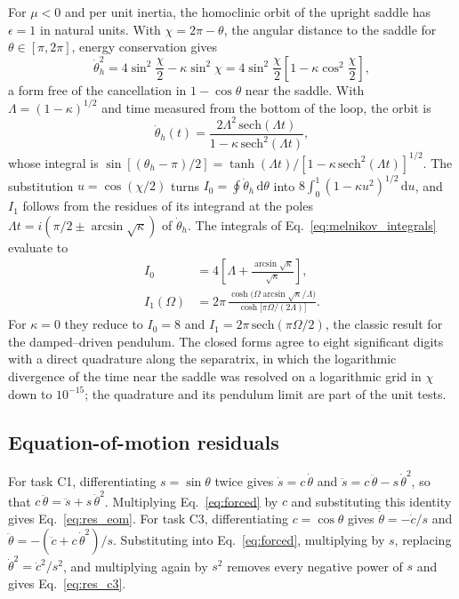 For $\mu<0$ and per unit inertia, the homoclinic orbit of the upright saddle has $\epsilon=1$ in natural units. With $\chi=2\pi-\theta$, the angular distance to the saddle for $\theta\in[\pi,2\pi]$, energy conservation gives
\begin{equation}
\dot\theta_h^{2} = 4\sin^{2}\frac{\chi}{2}-\kappa\sin^{2}\chi = 4\sin^{2}\frac{\chi}{2}\left[1-\kappa\cos^{2}\frac{\chi}{2}\right],
\end{equation}
a form free of the cancellation in $1-\cos\theta$ near the saddle. With $\Lambda=(1-\kappa)^{1/2}$ and time measured from the bottom of the loop, the orbit is
\begin{equation}
\dot\theta_h(t) = \frac{2\Lambda^{2}\,\mathrm{sech}(\Lambda t)}{1-\kappa\,\mathrm{sech}^{2}(\Lambda t)},
\end{equation}
whose integral is $\sin[(\theta_h-\pi)/2]=\tanh(\Lambda t)/[1-\kappa\,\mathrm{sech}^{2}(\Lambda t)]^{1/2}$. The substitution $u=\cos(\chi/2)$ turns $I_0=\oint\dot\theta_h\,\mathrm d\theta$ into $8\int_0^1(1-\kappa u^{2})^{1/2}\,\mathrm du$, and $I_1$ follows from the residues of its integrand at the poles $\Lambda t=i(\pi/2\pm\arcsin\sqrt\kappa)$ of $\dot\theta_h$. The integrals of Eq.~\eqref{eq:melnikov_integrals} evaluate to
\begin{align}
I_0 &= 4\left[\Lambda+\frac{\arcsin\sqrt\kappa}{\sqrt\kappa}\right],\\
I_1(\Omega) &= 2\pi\,\frac{\cosh\bigl(\Omega\arcsin\sqrt\kappa/\Lambda\bigr)}{\cosh\bigl[\pi\Omega/(2\Lambda)\bigr]} .
\end{align}
For $\kappa=0$ they reduce to $I_0=8$ and $I_1=2\pi\,\mathrm{sech}(\pi\Omega/2)$, the classic result for the damped--driven pendulum. The closed forms agree to eight significant digits with a direct quadrature along the separatrix, in which the logarithmic divergence of the time near the saddle was resolved on a logarithmic grid in $\chi$ down to $10^{-15}$; the quadrature and its pendulum limit are part of the unit tests.

\subsection{Equation-of-motion residuals}

For task C1, differentiating $s=\sin\theta$ twice gives $\dot s=c\,\dot\theta$ and $\ddot s=c\,\ddot\theta-s\,\dot\theta^{2}$, so that $c\,\ddot\theta=\ddot s+s\,\dot\theta^{2}$. Multiplying Eq.~\eqref{eq:forced} by $c$ and substituting this identity gives Eq.~\eqref{eq:res_eom}. For task C3, differentiating $c=\cos\theta$ gives $\dot\theta=-\dot c/s$ and $\ddot\theta=-(\ddot c+c\,\dot\theta^{2})/s$. Substituting into Eq.~\eqref{eq:forced}, multiplying by $s$, replacing $\dot\theta^{2}=\dot c^{2}/s^{2}$, and multiplying again by $s^{2}$ removes every negative power of $s$ and gives Eq.~\eqref{eq:res_c3}.
